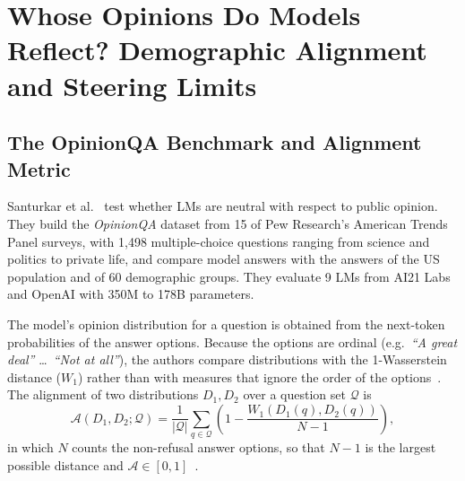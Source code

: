\section{Whose Opinions Do Models Reflect? Demographic Alignment and Steering Limits}
\label{sec:demographic_alignment}

\subsection{The OpinionQA Benchmark and Alignment Metric}
Santurkar et al.~\cite{santurkar2023whose} test whether LMs are neutral with respect to public opinion. They build the \emph{OpinionQA} dataset from 15 of Pew Research's American Trends Panel surveys, with 1,498 multiple-choice questions ranging from science and politics to private life, and compare model answers with the answers of the US population and of 60 demographic groups. They evaluate 9 LMs from AI21 Labs and OpenAI with 350M to 178B parameters. %

The model's opinion distribution for a question is obtained from the next-token probabilities of the answer options. Because the options are ordinal (e.g.\ \emph{``A great deal''} \dots\ \emph{``Not at all''}), the authors compare distributions with the 1-Wasserstein distance ($W_1$) rather than with measures that ignore the order of the options~\cite{santurkar2023whose}. %
The alignment of two distributions $D_1, D_2$ over a question set $\mathcal{Q}$ is
\begin{equation}
\mathcal{A}(D_1, D_2; \mathcal{Q}) = \frac{1}{|\mathcal{Q}|} \sum_{q \in \mathcal{Q}} \left( 1 - \frac{W_1(D_1(q), D_2(q))}{N - 1} \right),
\label{eq:wasserstein}
\end{equation}
in which $N$ counts the non-refusal answer options, so that $N-1$ is the largest possible distance and $\mathcal{A} \in [0,1]$~\cite{santurkar2023whose}. %


